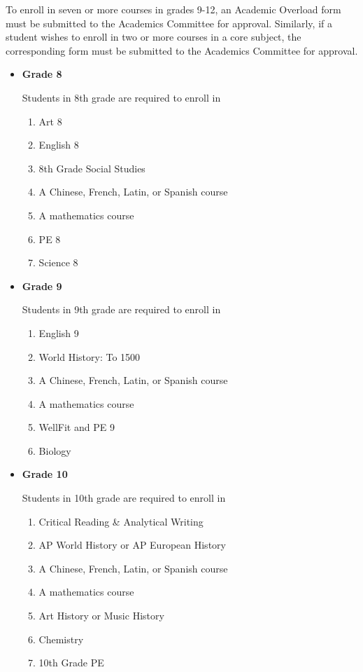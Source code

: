To enroll in seven or more courses in grades 9-12, an Academic Overload form must be submitted to the Academics Committee for approval.  Similarly, if a student wishes to enroll in two or more courses in a core subject, the corresponding form must be submitted to the Academics Committee for approval. 

\begin{itemize}\itemsep=0mm
  \item[] \textbf{Grade 8}
  
  Students in 8th grade are required to enroll in 
\begin{enumerate}\itemsep=0mm
    \item Art 8
    \item English 8
    \item 8th Grade Social Studies
    \item A Chinese, French, Latin, or Spanish course 
    \item A mathematics course
    \item PE 8
    \item Science 8
  \end{enumerate}
  

  
  \item[] \textbf{Grade 9}
  
  Students in 9th grade are required to enroll in 
\begin{enumerate}\itemsep=0mm
    \item English 9
    \item World History:  To 1500
    \item A Chinese, French, Latin, or Spanish course 
    \item A mathematics course
    \item WellFit and PE 9
    \item Biology
  \end{enumerate}
  
  \item[] \textbf{Grade 10}
  
  Students in 10th grade are required to enroll in 
\begin{enumerate}\itemsep=0mm
    \item Critical Reading \& Analytical Writing
    \item AP World History or AP European History
    \item A Chinese, French, Latin, or Spanish course 
    \item A mathematics course
    \item Art History or Music History
    \item Chemistry
    \item 10th Grade PE
  \end{enumerate}
  

\end{itemize}
